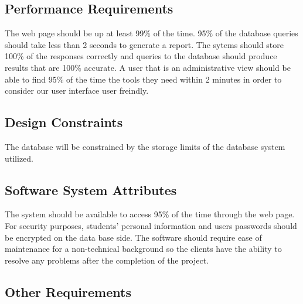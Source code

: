 \subsection{Performance Requirements}
The web page should be up at least 99\% of the time. 95\% of the database queries should take less than 2 seconds 
to generate a report. The sytems should store 100\% of the responses correctly and queries to the database should produce results that are 100\% accurate. 
A user that is an administrative view should be able to find 95\% of the time the tools they need within 2 minutes in order to consider our user interface user freindly. 

\subsection{Design Constraints}
The database will be constrained by the storage limits of the database system utilized.

\subsection{Software System Attributes}
 The system should be available to access 95\% of the time through the web page. For security purposes, 
students' personal information and users passwords should be encrypted on the data base side. %
The software should require ease of maintenance for a non-technical background so the clients have the ability to resolve any problems after the completion of the project.

\subsection{Other Requirements}




